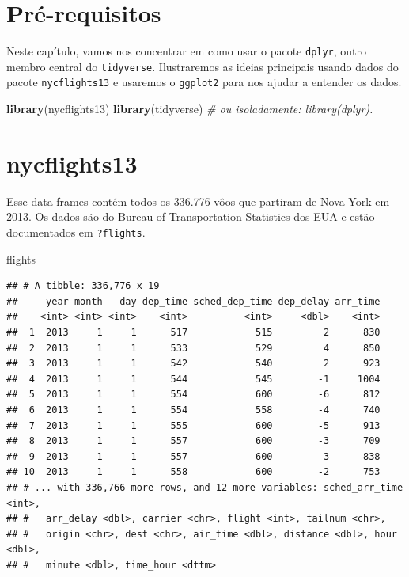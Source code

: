 \documentclass[]{book}
\newenvironment{Shaded}{\begin{snugshade}}{\end{snugshade}}
\newcommand{\CommentTok}[1]{\textcolor[rgb]{0.56,0.35,0.01}{\textit{#1}}}
\newcommand{\KeywordTok}[1]{\textcolor[rgb]{0.13,0.29,0.53}{\textbf{#1}}}
\newcommand{\NormalTok}[1]{#1}
\begin{document}
\hypertarget{pruxe9-requisitos-1}{%
\section{Pré-requisitos}\label{pruxe9-requisitos-1}}

Neste capítulo, vamos nos concentrar em como usar o pacote \texttt{dplyr}, outro membro central do \texttt{tidyverse}. Ilustraremos as ideias principais usando dados do pacote \texttt{nycflights13} e usaremos o \texttt{ggplot2} para nos ajudar a entender os dados.

\begin{Shaded}
\begin{Highlighting}[]
\KeywordTok{library}\NormalTok{(nycflights13)}
\KeywordTok{library}\NormalTok{(tidyverse) }\CommentTok{# ou isoladamente: library(dplyr).}
\end{Highlighting}
\end{Shaded}

\hypertarget{nycflights13}{%
\section{nycflights13}\label{nycflights13}}

Esse data frames contém todos os 336.776 vôos que partiram de Nova York em 2013. Os dados são do \href{https://www.transtats.bts.gov/DatabaseInfo.asp?DB_ID=120\&Link=0}{Bureau of Transportation Statistics} dos EUA e estão documentados em \texttt{?flights}.

\begin{Shaded}
\begin{Highlighting}[]
\NormalTok{flights}
\end{Highlighting}
\end{Shaded}

\begin{verbatim}
## # A tibble: 336,776 x 19
##     year month   day dep_time sched_dep_time dep_delay arr_time
##    <int> <int> <int>    <int>          <int>     <dbl>    <int>
##  1  2013     1     1      517            515         2      830
##  2  2013     1     1      533            529         4      850
##  3  2013     1     1      542            540         2      923
##  4  2013     1     1      544            545        -1     1004
##  5  2013     1     1      554            600        -6      812
##  6  2013     1     1      554            558        -4      740
##  7  2013     1     1      555            600        -5      913
##  8  2013     1     1      557            600        -3      709
##  9  2013     1     1      557            600        -3      838
## 10  2013     1     1      558            600        -2      753
## # ... with 336,766 more rows, and 12 more variables: sched_arr_time <int>,
## #   arr_delay <dbl>, carrier <chr>, flight <int>, tailnum <chr>,
## #   origin <chr>, dest <chr>, air_time <dbl>, distance <dbl>, hour <dbl>,
## #   minute <dbl>, time_hour <dttm>
\end{verbatim}
\end{document}

